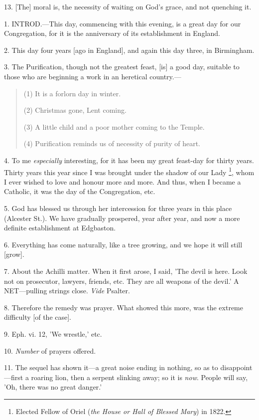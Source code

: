 13. [The] moral is, the necessity of waiting on
God's grace, and not quenching it.


1. INTROD.—This
day, commencing with this evening, is a great day for our
Congregation, for it is the anniversary of its establishment in
England.

2. This day four years [ago in England], and
again this day three, in Birmingham.

3. The Purification, though not the greatest
feast, [is] a good day, suitable to those who are beginning a work in
an heretical country.—

\begin{quote}

(1) It is a forlorn day in winter.

(2) Christmas gone, Lent coming.

(3) A little child and a poor mother coming to the Temple.

(4) Purification reminds us of necessity of purity of heart.

\end{quote}

4. To me \emph{especially} interesting, for it
has been my great feast-day for thirty years. Thirty years this year
since I was brought under the shadow of our Lady \footnote{Elected Fellow of Oriel
(\emph{the House or Hall of Blessed Mary}) in 1822.}, whom I ever wished to love and honour more and more.
And thus, when I became a Catholic, it was the day of the
Congregation, etc.

5. God has blessed us through her intercession
for three years in this place (Alcester St.). We have gradually
prospered, year after year, and now a more definite establishment at
Edgbaston.

6. Everything has come naturally, like a tree
growing, and we hope it will still [grow].

7. About the Achilli matter. When it first arose,
I said, 'The devil is here. Look not on prosecutor, lawyers, friends,
etc. They are all weapons of the devil.' A NET—pulling
strings close. \emph{Vide} Psalter.

8. Therefore the remedy was prayer. What showed
this more, was the extreme difficulty [of the case].

9. Eph. vi. 12, 'We wrestle,' etc.

10. \emph{Number} of prayers offered.

11. The sequel has shown it—a great noise
ending in nothing, so as to disappoint—first a roaring lion, then a
serpent slinking away; so it is \emph{now}. People will say, 'Oh,
there was no great danger.'

